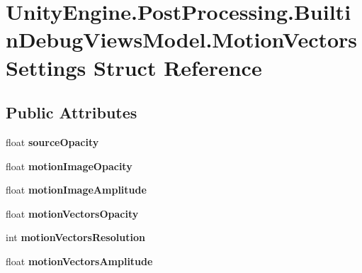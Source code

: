 \hypertarget{struct_unity_engine_1_1_post_processing_1_1_builtin_debug_views_model_1_1_motion_vectors_settings}{}\section{Unity\+Engine.\+Post\+Processing.\+Builtin\+Debug\+Views\+Model.\+Motion\+Vectors\+Settings Struct Reference}
\label{struct_unity_engine_1_1_post_processing_1_1_builtin_debug_views_model_1_1_motion_vectors_settings}
\subsection*{Public Attributes}
\begin{DoxyCompactItemize}
\item 
\mbox{\label{struct_unity_engine_1_1_post_processing_1_1_builtin_debug_views_model_1_1_motion_vectors_settings_a91b2ff76ba74de1a0936a9355bc1cd9d}} 
float {\bfseries source\+Opacity}
\item 
\mbox{\label{struct_unity_engine_1_1_post_processing_1_1_builtin_debug_views_model_1_1_motion_vectors_settings_a6e819ab3253862df023fb1896a6aef82}} 
float {\bfseries motion\+Image\+Opacity}
\item 
\mbox{\label{struct_unity_engine_1_1_post_processing_1_1_builtin_debug_views_model_1_1_motion_vectors_settings_ae9b48dec9a61b95629ac417422e4abaf}} 
float {\bfseries motion\+Image\+Amplitude}
\item 
\mbox{\label{struct_unity_engine_1_1_post_processing_1_1_builtin_debug_views_model_1_1_motion_vectors_settings_a3ac83df1f4be5b7c21d5faf59b5137be}} 
float {\bfseries motion\+Vectors\+Opacity}
\item 
\mbox{\label{struct_unity_engine_1_1_post_processing_1_1_builtin_debug_views_model_1_1_motion_vectors_settings_a430de72f2675b6a2013581e767b911af}} 
int {\bfseries motion\+Vectors\+Resolution}
\item 
\mbox{\label{struct_unity_engine_1_1_post_processing_1_1_builtin_debug_views_model_1_1_motion_vectors_settings_a13baa67aab098f06ea3748a1106b893d}} 
float {\bfseries motion\+Vectors\+Amplitude}
\end{DoxyCompactItemize}
